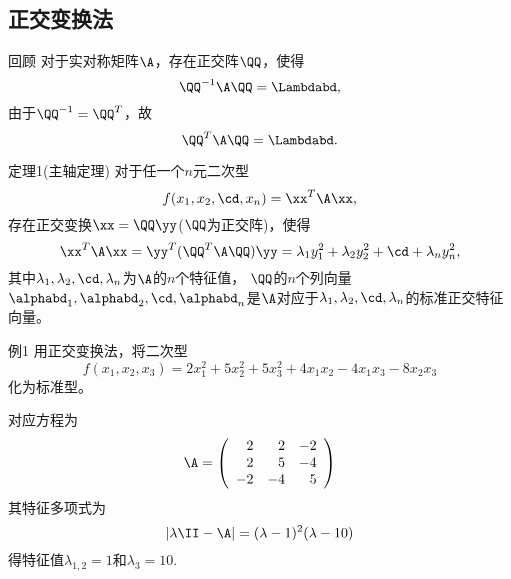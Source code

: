 
\subsection{正交变换法}


\begin{frame}
  \begin{footnotesize}
    \begin{block}{回顾}
      对于实对称矩阵$\A$，存在正交阵$\QQ$，使得
      $$
      \QQ^{-1}\A\QQ=\Lambdabd,
      $$
      由于$\QQ^{-1}=\QQ^T$，故
      $$
      \QQ^{T}\A\QQ=\Lambdabd.
      $$
    \end{block}
  \end{footnotesize}
\end{frame}

\begin{frame}
  \begin{footnotesize}
    \begin{block}{定理1(主轴定理)}
      对于任一个$n$元二次型
      $$
      f(x_1,x_2,\cd,x_n)=\xx^T\A\xx,
      $$
      存在正交变换$\xx=\QQ\yy$($\QQ$为正交阵)，使得
      $$
      \xx^T\A\xx=\yy^T(\QQ^T\A\QQ)\yy=\lambda_1y_1^2+\lambda_2y_2^2+\cd+\lambda_ny_n^2,
      $$
      其中$\lambda_1,\lambda_2,\cd,\lambda_n$为$\A$的$n$个特征值，
      $\QQ$的$n$个列向量$\alphabd_1,\alphabd_2,\cd,\alphabd_n$是$\A$对应于$\lambda_1,\lambda_2,\cd,\lambda_n$的标准正交特征向量。
    \end{block}
  \end{footnotesize}
\end{frame}



\begin{frame}
  \begin{footnotesize}
    \begin{exampleblock}{例1}
      用正交变换法，将二次型
      $$
      f(x_1,x_2,x_3)=2x_1^2+5x_2^2+5x_3^2+4x_1x_2-4x_1x_3-8x_2x_3
      $$
      化为标准型。
    \end{exampleblock}
    \pause\jiename
    对应方程为
    $$
    \A=\left(
    \begin{array}{rrr}
      2&2&-2\\
      2&5&-4\\
      -2&-4&5
    \end{array}
    \right)
    $$
    \pause
    其特征多项式为
    $$
    |\lambda\II-\A|=(\lambda-1)^2(\lambda-10)
    $$
    得特征值$\lambda_{1,2}=1$和$\lambda_3=10$.
  \end{footnotesize}
\end{frame}


